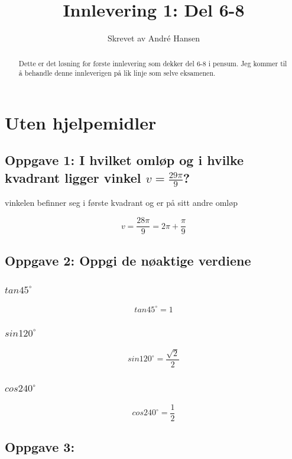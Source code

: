 \documentclass{article}
\title{Innlevering 1: Del 6-8}
\author{Skrevet av André Hansen}
\begin{document}
\maketitle

\begin{abstract}
Dette er det løsning for første innlevering som dekker del 6-8 i pensum. Jeg kommer til å behandle denne innleverigen på lik linje som selve eksamenen.
\end{abstract}

\section{Uten hjelpemidler}

\subsection{Oppgave 1: I hvilket omløp og i hvilke kvadrant ligger vinkel $v= \frac{29 \pi}{9}$?}

vinkelen befinner seg i første kvadrant og er på sitt andre omløp

$$v = \frac{28 \pi}{9} = 2 \pi + \frac{\pi}{9}$$

\subsection{Oppgave 2: Oppgi de nøaktige verdiene}

\subsubsection{$tan 45^{\circ}$}

$$tan 45^{\circ} = 1$$

\subsubsection{$sin 120^{\circ}$}

$$sin 120^{\circ} = \frac{\sqrt{2}}{2}$$

\subsubsection{$cos 240^{\circ}$}

$$cos 240^{\circ} = \frac{1}{2}$$

\subsection{Oppgave 3:}
\end{document}
